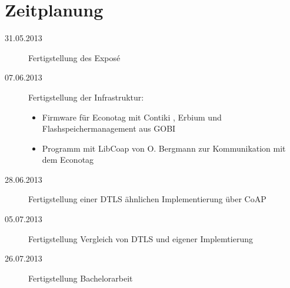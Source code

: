 \documentclass[a4paper,10pt]{report}
\begin{document}
\section{Zeitplanung}
\begin{description}
  \item[31.05.2013] Fertigstellung des Exposé
  \item[07.06.2013] Fertigstellung der Infrastruktur:
    \begin{itemize}
      \item Firmware für Econotag mit Contiki \cite{contiki}, Erbium \cite{erbium} und Flashspeichermanagement aus GOBI
      \item Programm mit LibCoap \cite{libcoap} von O. Bergmann zur Kommunikation mit dem Econotag
    \end{itemize}
  \item[28.06.2013] Fertigstellung einer DTLS ähnlichen Implementierung über CoAP
  \item[05.07.2013] Fertigstellung Vergleich von DTLS und eigener Implemtierung
  \item[26.07.2013] Fertigstellung Bachelorarbeit
\end{description}

\nocite{*}

\printbibliography
\end{document}
